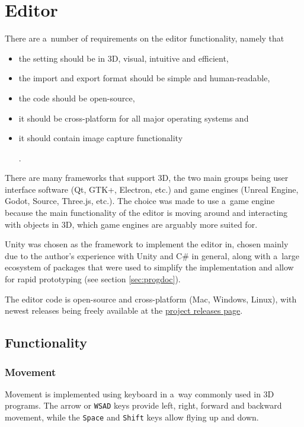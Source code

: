 \chapter{Editor}\label{sec:editor}
There are a~number of requirements on the editor functionality, namely that
\begin{itemize}
	\item the setting should be in 3D, visual, intuitive and efficient,
	\item the import and export format should be simple and human-readable,
	\item the code should be open-source,
	\item it should be cross-platform for all major operating systems and
	\item it should contain image capture functionality.
\end{itemize}

There are many frameworks that support 3D, the two main groups being user interface software (Qt, GTK+, Electron, etc.) and game engines (Unreal Engine, Godot, Source, Three.js, etc.).
The choice was made to use a~game engine because the main functionality of the editor is moving around and interacting with objects in 3D, which game engines are arguably more suited for.

Unity was chosen as the framework to implement the editor in, chosen mainly due to the author's experience with Unity and C\# in general, along with a~large ecosystem of packages that were used to simplify the implementation and allow for rapid prototyping (see section \ref{sec:progdoc}).

The editor code is open-source and cross-platform (Mac, Windows, Linux), with newest releases being freely available at the \href{https://github.com/Climber-Tools/Cled/releases}{project releases page}.

\section{Functionality}

\subsection{Movement}
Movement is implemented using keyboard in a~way commonly used in 3D programs.
The arrow or \verb|WSAD| keys provide left, right, forward and backward movement, while the \verb|Space| and \verb|Shift| keys allow flying up and down.


